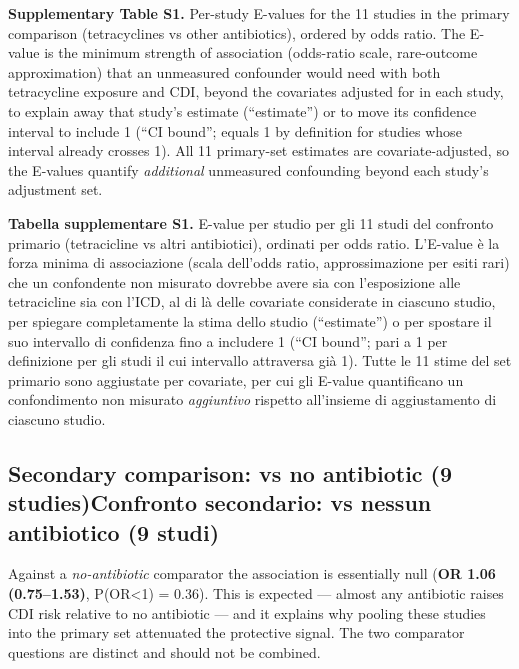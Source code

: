 \documentclass[
  letterpaper,
  DIV=11,
  numbers=noendperiod]{scrartcl}
\begin{document}
\textbf{Supplementary Table S1.} Per-study E-values for the 11 studies
in the primary comparison (tetracyclines vs other antibiotics), ordered
by odds ratio. The E-value is the minimum strength of association
(odds-ratio scale, rare-outcome approximation) that an unmeasured
confounder would need with both tetracycline exposure and CDI, beyond
the covariates adjusted for in each study, to explain away that study's
estimate (``estimate'') or to move its confidence interval to include 1
(``CI bound''; equals 1 by definition for studies whose interval already
crosses 1). All 11 primary-set estimates are covariate-adjusted, so the
E-values quantify \emph{additional} unmeasured confounding beyond each
study's adjustment set.

\textbf{Tabella supplementare S1.} E-value per studio per gli 11 studi
del confronto primario (tetracicline vs altri antibiotici), ordinati per
odds ratio. L'E-value è la forza minima di associazione (scala dell'odds
ratio, approssimazione per esiti rari) che un confondente non misurato
dovrebbe avere sia con l'esposizione alle tetracicline sia con l'ICD, al
di là delle covariate considerate in ciascuno studio, per spiegare
completamente la stima dello studio (``estimate'') o per spostare il suo
intervallo di confidenza fino a includere 1 (``CI bound''; pari a 1 per
definizione per gli studi il cui intervallo attraversa già 1). Tutte le
11 stime del set primario sono aggiustate per covariate, per cui gli
E-value quantificano un confondimento non misurato \emph{aggiuntivo}
rispetto all'insieme di aggiustamento di ciascuno studio.

\subsection{\texorpdfstring{{Secondary comparison: vs no antibiotic (9
studies)}{Confronto secondario: vs nessun antibiotico (9
studi)}}{Secondary comparison: vs no antibiotic (9 studies)Confronto secondario: vs nessun antibiotico (9 studi)}}\label{secondary-comparison-vs-no-antibiotic-9-studiesconfronto-secondario-vs-nessun-antibiotico-9-studi}

Against a \emph{no-antibiotic} comparator the association is essentially
null (\textbf{OR 1.06 (0.75--1.53)}, P(OR\textless1) = 0.36). This is
expected --- almost any antibiotic raises CDI risk relative to no
antibiotic --- and it explains why pooling these studies into the
primary set attenuated the protective signal. The two comparator
questions are distinct and should not be combined.
\end{document}
